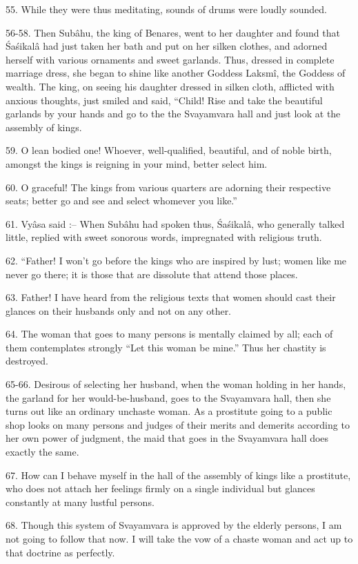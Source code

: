55. While they were thus meditating, sounds of drums were loudly sounded.

56-58. Then Sub\^ahu, the king of Benares, went to her daughter and found that \'Sa\'sikal\^a had just taken her bath and put on her silken clothes, and adorned herself with various ornaments and sweet garlands. Thus, dressed in complete marriage dress, she began to shine like another Goddess Laksm\^i, the Goddess of wealth. The king, on seeing his daughter dressed in silken cloth, afflicted with anxious thoughts, just smiled and said, ``Child! Rise and take the beautiful garlands by your hands and go to the the Svayamvara hall and just look at the assembly of kings.

59. O lean bodied one! Whoever, well-qualified, beautiful, and of noble birth, amongst the kings is reigning in your mind, better select him.

60. O graceful! The kings from various quarters are adorning their respective seats; better go and see and select whomever you like.''

61. Vy\^asa said :-- When Sub\^ahu had spoken thus, \'Sa\'sikal\^a, who generally talked little, replied with sweet sonorous words, impregnated with religious truth.

62. ``Father! I won't go before the kings who are inspired by lust; women like me never go there; it is those that are dissolute that attend those places.

63. Father! I have heard from the religious texts that women should cast their glances on their husbands only and not on any other.

64. The woman that goes to many persons is mentally claimed by all; each of them contemplates strongly ``Let this woman be mine.'' Thus her chastity is destroyed.

65-66. Desirous of selecting her husband, when the woman holding in her hands, the garland for her would-be-husband, goes to the Svayamvara hall, then she turns out like an ordinary unchaste woman. As a prostitute going to a public shop looks on many persons and judges of their merits and demerits according to her own power of judgment, the maid that goes in the Svayamvara hall does exactly the same.

67. How can I behave myself in the hall of the assembly of kings like a prostitute, who does not attach her feelings firmly on a single individual but glances constantly at many lustful persons.

68. Though this system of Svayamvara is approved by the elderly persons, I am not going to follow that now. I will take the vow of a chaste woman and act up to that doctrine as perfectly.

